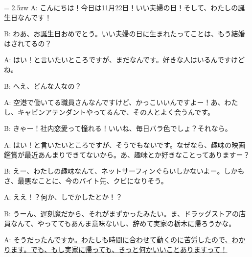 \documentclass[11pt]{amsart}
\title{}
\author{}
\newenvironment{hangall}[1]{\hangindent = 2.5zw\everypar{\hangindent = 2.5zw}}{}
\begin{document}
\maketitle
\begin{hangall}{}%
A: こんにちは！今日は11月22日！いい夫婦の日！そして、わたしの誕生日なんです！

B: わあ、お誕生日おめでとう。いい夫婦の日に生まれたってことは、もう結婚はされてるの？

A: はい！と言いたいところですが、まだなんです。好きな人はいるんですけどね。

B: へえ、どんな人なの？

A: 空港で働いてる職員さんなんですけど、かっこいいんですよー！あ、わたし、キャビンアテンダントやってるんで、その人とよく会うんです。

B: きゃー！社内恋愛って憧れる！いいね、毎日バラ色でしょ？それなら。

A: はい！と言いたいところですが、そうでもないです。なぜなら、趣味の映画鑑賞が最近あんまりできてないから。あ、趣味とか好きなことってありますー？

B: えー、わたしの趣味なんて、ネットサーフィンぐらいしかないよー。しかもさ、最悪なことに、今のバイト先、クビになりそう。

A: ええ！？何か、しでかしたとか！？

B: うーん、遅刻魔だから、それがまずかったみたい。ま、ドラッグストアの店員なんて、やっててもあんま意味ないし、辞めて実家の栃木に帰ろうかな。

A: \ul{そうだったんですか。わたしも時間に合わせて動くのに苦労したので、わかります。でも、もし実家に帰っても、きっと何かいいことありますって！}\end{hangall}
\end{document}
